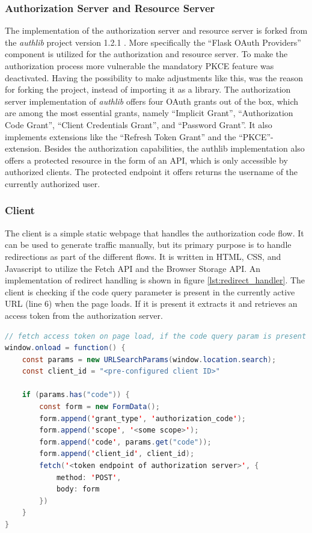 \documentclass[
    fontsize=12pt,
    headings=small,
    parskip=half,           %
    bibliography=totoc,
    numbers=noenddot,       %
    open=any,               %
    ]{scrreprt}
\begin{document}
\subsubsection{Authorization Server and Resource Server}
The implementation of the authorization server and resource server is forked from the \emph{authlib} project version 1.2.1 \cite{authlib2023}. More specifically the ``Flask OAuth Providers'' component is utilized for the authorization and resource server. To make the authorization process more vulnerable the mandatory PKCE feature was deactivated. Having the possibility to make adjustments like this, was the reason for forking the project, instead of importing it as a library. The authorization server implementation of \emph{authlib} offers four OAuth grants out of the box, which are among the most essential grants, namely ``Implicit Grant'', ``Authorization Code Grant'', ``Client Credentials Grant'', and ``Password Grant''. It also implements extensions like the ``Refresh Token Grant'' and the ``PKCE''-extension. Besides the authorization capabilities, the authlib implementation also offers a protected resource in the form of an API, which is only accessible by authorized clients. The protected endpoint it offers returns the username of the currently authorized user.

\subsubsection{Client}
The client is a simple static webpage that handles the authorization code flow. It can be used to generate traffic manually, but its primary purpose is to handle redirections as part of the different flows. It is written in HTML, CSS, and Javascript to utilize the Fetch API and the Browser Storage API. An implementation of redirect handling is shown in figure \ref{lst:redirect_handler}. The client is checking if the code query parameter is present in the currently active URL (line 6) when the page loads. If it is present it extracts it and retrieves an access token from the authorization server.

\begin{lstlisting}[language={java}, caption={Example implementation of authorization code handling at the client}, label={lst:redirect_handler}]
// fetch access token on page load, if the code query param is present
window.onload = function() {
	const params = new URLSearchParams(window.location.search);
	const client_id = "<pre-configured client ID>"

	if (params.has("code")) {
		const form = new FormData();
		form.append('grant_type', 'authorization_code');
		form.append('scope', '<some scope>');
		form.append('code', params.get("code"));
		form.append('client_id', client_id);
		fetch('<token endpoint of authorization server>', {
			method: 'POST',
			body: form
		})
	}
}
\end{lstlisting}
\end{document}
